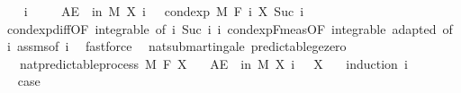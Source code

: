 \begin{isabellebody}
\ \ \isamarkupfalse%
\ i\ \isanewline
\ \ \isamarkupfalse%
\ {\isachardoublequoteopen}AE\ {\isasymxi}\ in\ M{\isachardot}{\kern0pt}\ X\ i\ {\isasymxi}\ {\isacharequal}{\kern0pt}\ cond{\isacharunderscore}{\kern0pt}exp\ M\ {\isacharparenleft}{\kern0pt}F\ i{\isacharparenright}{\kern0pt}\ {\isacharparenleft}{\kern0pt}X\ {\isacharparenleft}{\kern0pt}Suc\ i{\isacharparenright}{\kern0pt}{\isacharparenright}{\kern0pt}\ {\isasymxi}{\isachardoublequoteclose}\ \isamarkupfalse%
\ cond{\isacharunderscore}{\kern0pt}exp{\isacharunderscore}{\kern0pt}diff{\isacharbrackleft}{\kern0pt}OF\ integrable{\isacharparenleft}{\kern0pt}{}{\isacharcomma}{\kern0pt}{}{\isacharparenright}{\kern0pt}{\isacharcomma}{\kern0pt}\ of\ i\ {\isachardoublequoteopen}Suc\ i{\isachardoublequoteclose}\ i{\isacharbrackright}{\kern0pt}\ cond{\isacharunderscore}{\kern0pt}exp{\isacharunderscore}{\kern0pt}F{\isacharunderscore}{\kern0pt}meas{\isacharbrackleft}{\kern0pt}OF\ integrable\ adapted{\isacharcomma}{\kern0pt}\ of\ i{\isacharbrackright}{\kern0pt}\ assms{\isacharparenleft}{\kern0pt}{}{\isacharparenright}{\kern0pt}{\isacharbrackleft}{\kern0pt}of\ i{\isacharbrackright}{\kern0pt}\ \isamarkupfalse%
\ fastforce\isanewline
{}\isamarkupfalse%
%
\endisatagproof
{\isafoldproof}%
%
\isadelimproof
%
\endisadelimproof
%
\isadelimdocument
%
\endisadelimdocument
%
\isatagdocument
%
\isamarkuptrue%
%
\endisatagdocument
{\isafolddocument}%
%
\isadelimdocument
%
\endisadelimdocument
{}\isamarkupfalse%
\ {\isacharparenleft}{\kern0pt}\ nat{\isacharunderscore}{\kern0pt}submartingale{\isacharparenright}{\kern0pt}\ predictable{\isacharunderscore}{\kern0pt}ge{\isacharunderscore}{\kern0pt}zero{\isacharcolon}{\kern0pt}\isanewline
\ \ \ {\isachardoublequoteopen}nat{\isacharunderscore}{\kern0pt}predictable{\isacharunderscore}{\kern0pt}process\ M\ F\ X{\isachardoublequoteclose}\isanewline
\ \ \ {\isachardoublequoteopen}AE\ {\isasymxi}\ in\ M{\isachardot}{\kern0pt}\ X\ i\ {\isasymxi}\ {\isasymge}\ X\ {}\ {\isasymxi}{\isachardoublequoteclose}\isanewline
%
\isadelimproof
%
\endisadelimproof
%
\isatagproof
{}\isamarkupfalse%
\ {\isacharparenleft}{\kern0pt}induction\ i{\isacharparenright}{\kern0pt}\isanewline
\ \ \isamarkupfalse%
\ {}\isanewline
\ \ \isamarkupfalse%
\ \isamarkupfalse%
\ {\isacharquery}{\kern0pt}case\ \isamarkupfalse%

\end{isabellebody}
